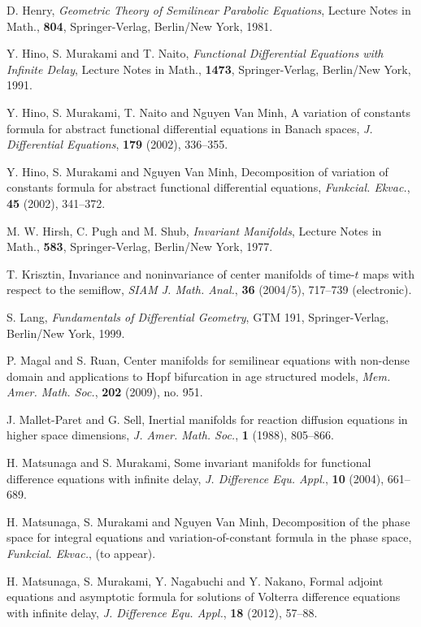 \documentclass[12pt]{amsart}
\begin{document}
\begin{thebibliography}{10}
D. Henry, {\it Geometric Theory of Semilinear Parabolic Equations},
Lecture Notes in Math., {\bf 804}, Springer-Verlag, Berlin/New York, 1981.

Y. Hino, S. Murakami and T. Naito, 
{\it Functional Differential Equations with Infinite Delay},
Lecture Notes in Math., {\bf 1473}, Springer-Verlag, Berlin/New York, 1991.

Y. Hino, S. Murakami, T. Naito and Nguyen Van Minh, 
A variation of constants formula for abstract functional differential 
equations in  Banach spaces,
{\it J. Differential Equations}, {\bf 179} (2002), 336--355.

Y. Hino, S. Murakami and Nguyen Van Minh, 
Decomposition of variation of constants formula for abstract functional 
differential equations,
{\it Funkcial. Ekvac.}, {\bf 45} (2002), 341--372.

M. W. Hirsh, C. Pugh and M. Shub, {\it Invariant Manifolds}, 
Lecture Notes in Math., {\bf 583}, Springer-Verlag, Berlin/New York, 1977. 

T. Krisztin, Invariance and noninvariance of center manifolds of 
time-$t$ maps with respect to the semiflow, 
{\it SIAM J. Math. Anal.}, {\bf 36} (2004/5), 717--739 (electronic). 

S. Lang, {\it Fundamentals of Differential Geometry}, 
GTM 191, Springer-Verlag, Berlin/New York, 1999. 

P. Magal and S. Ruan, Center manifolds for semilinear equations with 
non-dense domain and applications to Hopf bifurcation in age structured 
models, {\it Mem. Amer. Math. Soc.}, {\bf 202} (2009), no. 951.

J. Mallet-Paret and G. Sell, Inertial manifolds for reaction diffusion 
equations in higher space dimensions, 
{\it J. Amer. Math. Soc.}, {\bf 1} (1988), 805--866.

H. Matsunaga and S. Murakami, Some invariant manifolds for functional 
difference equations with infinite delay,  
{\it J. Difference Equ. Appl.}, {\bf 10} (2004), 661--689. 

H. Matsunaga, S. Murakami and  Nguyen Van Minh,
Decomposition of the phase space for integral equations and 
variation-of-constant formula in the phase space, 
{\it Funkcial. Ekvac.}, (to appear). 

H. Matsunaga, S. Murakami, Y. Nagabuchi and Y. Nakano, 
Formal adjoint equations and asymptotic formula for solutions of 
Volterra difference equations with infinite delay, 
{\it J. Difference Equ. Appl.}, {\bf 18} (2012), 57--88. 


\end{thebibliography}
\end{document}
